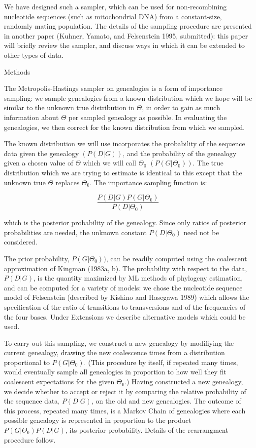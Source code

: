 We have designed such a sampler, which can be used for non-recombining
nucleotide sequences (such as mitochondrial DNA) from a constant-size, randomly
mating population.  The details of the sampling procedure are presented
in another paper (Kuhner, Yamato, and Felsenstein 1995, submitted):  this paper
will briefly review the sampler, and discuss ways in which it can be
extended to other types of data.

\bigskip
{\center Methods}
\bigskip

The Metropolis-Hastings sampler on genealogies is a form of importance
sampling:  we sample genealogies from a known distribution which we hope
will be similar to the unknown true distribution in $\Theta$, in order
to gain as much information about $\Theta$ per sampled genealogy as
possible.  In evaluating the genealogies, we then correct for the
known distribution from which we sampled.

The known distribution we will use incorporates the probability of the
sequence data given the genealogy $(P(D|G))$, and the probability of the
genealogy given a chosen value of $\Theta$ which we will call
$\Theta_0$ $(P(G|\Theta_0))$.  The true distribution which we are trying
to estimate is identical to this except that the unknown true $\Theta$
replaces $\Theta_0$.  The importance sampling function is:
\bigskip

\begin{displaymath}
\frac{P(D|G)P(G|\Theta_0)}{P(D|\Theta_0)}
\end{displaymath}

\bigskip

which is the posterior probability of the genealogy.  Since only ratios
of posterior probabilities are needed, the unknown constant
$P(D|\Theta_0)$ need not be considered.

The prior probability, $P(G|\Theta_0))$, can be readily computed using the 
coalescent
approximation of Kingman (1983a, b).
The probability with respect to the data, $P(D|G)$, is the quantity maximized by ML methods of phylogeny
estimation, and can be computed for a variety of models:  we chose the
nucleotide sequence model of Felsenstein (described by Kishino and
Hasegawa 1989) which allows the specification of the ratio of
transitions to transversions and of the frequencies of the four bases.
Under Extensions we describe alternative models which could be used.

To carry out this sampling, we construct a new genealogy by modifiying the
current genealogy, drawing the new coalescence times from a
distribution proportional to $P(G|\Theta_0)$.  (This procedure by itself, if
repeated many times, would eventually sample all genealogies in
proportion to how well they fit coalescent expectations for the given 
$\Theta_0$.)  Having
constructed a new genealogy, we decide whether to accept or reject it by
comparing the relative probability of the sequence data, $P(D|G)$, on
the old and new genealogies.  The outcome of this process, repeated many
times, is a Markov Chain of genealogies where each possible genealogy is
represented in proportion to the product $P(G|\Theta_0)P(D|G)$, its
posterior probability. 
Details of the 
rearrangment procedure follow.

